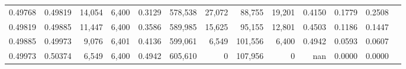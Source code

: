 \begin{tabular}{rrrrrrrrrrrrr}
0.49768 & 0.49819 &  14,054 & 6,400 &                                     0.3129 & 578,538 &  27,072 &  88,755 &  19,201 & 0.4150 & 0.1779 & 0.2508 \\
0.49819 & 0.49885 &  11,447 & 6,400 &                                     0.3586 & 589,985 &  15,625 &  95,155 &  12,801 & 0.4503 & 0.1186 & 0.1447 \\
0.49885 & 0.49973 &   9,076 & 6,401 &                                     0.4136 & 599,061 &   6,549 & 101,556 &   6,400 & 0.4942 & 0.0593 & 0.0607 \\
0.49973 & 0.50374 &   6,549 & 6,400 &                                     0.4942 & 605,610 &       0 & 107,956 &       0 &    nan & 0.0000 & 0.0000 \\
\bottomrule
\end{tabular}
